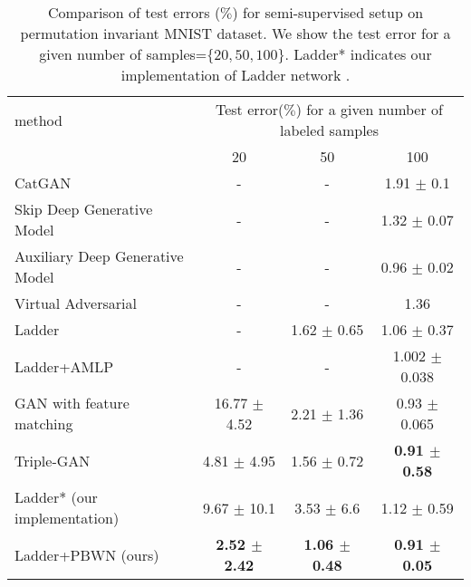 \documentclass[twocolumn]{article}
\begin{document}
\begin{table*}[t]
\caption{Comparison of test errors ($\%$) for semi-supervised setup on permutation invariant MNIST dataset. We show the test error for a given number of samples=$\{20, 50, 100\}$. Ladder* indicates  our implementation of Ladder network \cite{2015_NIPS_Rasmus}.}
\label{table:semi}
\vskip 0.0in
\begin{center}
\begin{small}
\begin{tabular}{l|ccc}
\toprule
method & \multicolumn{3}{c}{Test error($\%$) for a given number of labeled samples} \\
     & 20 & 50 & 100  \\
\hline

CatGAN \cite{2016_ICLR_Springenberg} &  -  & - & 1.91 $\pm$ 0.1   \\
Skip Deep Generative Model \cite{2016_ICML_Maal} & - & - &  1.32 $\pm$ 0.07   \\
Auxiliary Deep Generative Model\cite{2016_ICML_Maal} & - & - &  0.96 $\pm$ 0.02     \\
Virtual Adversarial \cite{2017_CoRR_Miyato} &  - &- & 1.36  \\
Ladder \cite{2015_NIPS_Rasmus}& - & 1.62 $\pm$ 0.65 & 1.06 $\pm$ 0.37    \\
Ladder+AMLP \cite{2016_ICML_Pezeshki}& - &-  &  1.002 $\pm$ 0.038  \\
GAN with feature matching \cite{2016_NIPS_Goodfellow}& 16.77 $\pm$ 4.52 &  2.21 $\pm$ 1.36 & 0.93  $\pm$ 0.065  \\
Triple-GAN \cite{2017_Corr_Li}& 4.81 $\pm$ 4.95 &  1.56 $\pm$ 0.72 & \textbf{0.91  $\pm$ 0.58}  \\
\hline
Ladder* (our implementation) & 9.67 $\pm$ 10.1 & 3.53 $\pm$ 6.6 &  1.12 $\pm$ 0.59  \\
Ladder+PBWN (ours) & \textbf{2.52 $\pm$ 2.42 }& \textbf{1.06 $\pm$ 0.48} & \textbf{0.91  $\pm$ 0.05}  \\
\hline
\bottomrule
\end{tabular}
\end{small}
\end{center}
  \vspace{-0.1in}
\end{table*}
\end{document}
